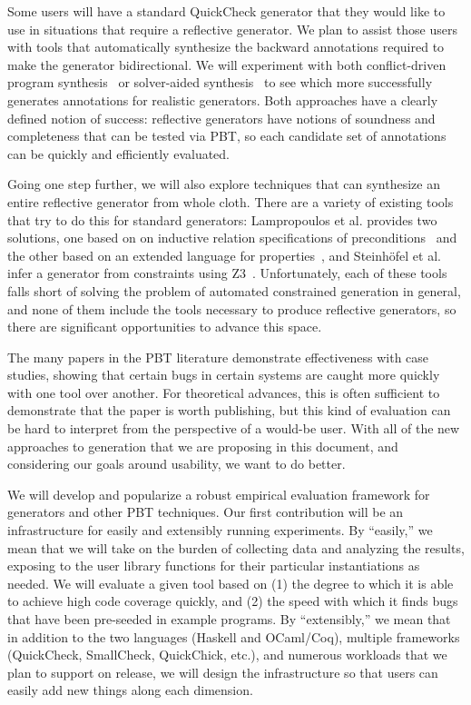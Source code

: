 Some users will have a standard QuickCheck generator that they would like to use
in situations that require a reflective generator. We plan to assist those
users with tools that automatically synthesize the backward annotations
required to make the generator bidirectional. We will experiment with both
conflict-driven program synthesis~\cite{feng_program_2018} or solver-aided
synthesis~\cite{torlak_growing_2013} to see which more successfully generates
annotations for realistic generators. Both approaches have a clearly defined
notion of success: reflective generators have notions of soundness and
completeness that can be tested via PBT, so each candidate set of annotations
can be quickly and efficiently evaluated.

Going one step further, we will also explore techniques that can synthesize an
entire reflective generator from whole cloth. There are a variety of existing
tools that try to do this for standard generators: Lampropoulos et al. provides
two solutions, one based on on inductive relation specifications of
preconditions~\cite{lampropoulos2017generating} and the other based on an
extended language for properties~\cite{beginners-luck}, and Steinh\"ofel et al.
infer a generator from constraints using
Z3~\cite{steinhofel_input_2022,de_moura_z3_2008}. Unfortunately, each of these
tools falls short of solving the problem of automated constrained generation in
general, and none of them include the tools necessary to produce reflective
generators, so there are significant opportunities to advance this space.

%
\iflater{}\fi
\iflater{}\fi
%
The many papers in the PBT literature demonstrate effectiveness with case
studies, showing that certain bugs in certain systems are caught more quickly
with one tool over another. For theoretical advances, this is often sufficient
to demonstrate that the paper is worth publishing, but this kind of evaluation
can be hard to interpret from the perspective of a would-be user. With all of
the new approaches to generation that we are proposing in this document, and
considering our goals around usability, we want to do better.

We will develop and popularize a robust empirical evaluation framework for
generators and other PBT techniques. Our first contribution will be an
infrastructure for easily and extensibly running experiments.  By ``easily,'' we
mean that we will take on the burden of collecting data and analyzing the
results, exposing to the user library functions for their particular
instantiations as needed. We will evaluate a given tool based on (1) the degree
to which it is able to achieve high code coverage quickly, and (2) the speed
with which it finds bugs that have been pre-seeded in example programs. By
``extensibly,'' we mean that in addition to the two languages (Haskell and
OCaml/Coq), multiple frameworks (QuickCheck, SmallCheck, QuickChick, etc.), and
numerous workloads that we plan to support on release, we will design the
infrastructure so that users can easily add new things along each dimension.

